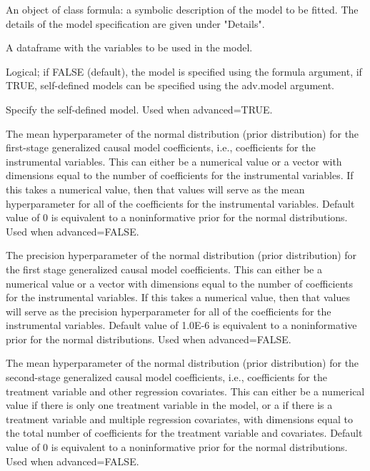 \documentclass[a4paper]{book}
\begin{document}
%
\begin{Arguments}
\begin{ldescription}
\item[\code{formula}] An object of class formula: a symbolic description of the model to be fitted.
The details of the model specification are given under "Details".

\item[\code{data}] A dataframe with the variables to be used in the model.

\item[\code{advanced}] Logical; if FALSE (default), the model is specified using the formula argument,
if TRUE, self-defined models can be specified using the adv.model argument.

\item[\code{adv.model}] Specify the self-defined model. Used when advanced=TRUE.

\item[\code{b0}] The mean hyperparameter of the normal distribution (prior distribution)
for the first-stage generalized causal model coefficients, i.e., coefficients for the instrumental variables.
This can either be a numerical value or a vector with dimensions equal to the number of coefficients
for the instrumental variables. If this takes a numerical value, then that values will
serve as the mean hyperparameter for all of the coefficients for the instrumental variables.
Default value of 0 is equivalent to a noninformative prior for the normal distributions.
Used when advanced=FALSE.

\item[\code{B0}] The precision hyperparameter of the normal distribution (prior distribution)
for the first stage generalized causal model coefficients.
This can either be a numerical value or a vector with dimensions equal to the number of coefficients
for the instrumental variables. If this takes a numerical value, then that values will
serve as the precision hyperparameter for all of the coefficients for the instrumental variables.
Default value of 1.0E-6 is equivalent to a noninformative prior for the normal distributions.
Used when advanced=FALSE.

\item[\code{g0}] The mean hyperparameter of the normal distribution (prior distribution)
for the second-stage generalized causal model coefficients,
i.e., coefficients for the treatment variable and other regression covariates.
This can either be a numerical value if there is only one treatment variable in the model,
or a if there is a treatment variable and multiple regression covariates,
with dimensions equal to the total number of coefficients for the treatment variable and covariates.
Default value of 0 is equivalent to a noninformative prior for the normal distributions.
Used when advanced=FALSE.


\end{ldescription}
\end{Arguments}
\end{document}
